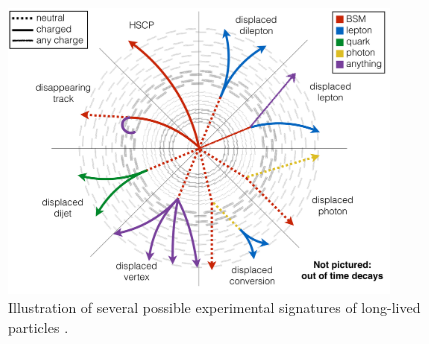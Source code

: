\begin{figure}
\centering
\includegraphics[width=0.9\textwidth]{figures/overview/llp_signatures.pdf}
\caption{Illustration of several possible experimental signatures of long-lived particles \cite{jamie}.} 
\label{llp_signatures}
\end{figure}